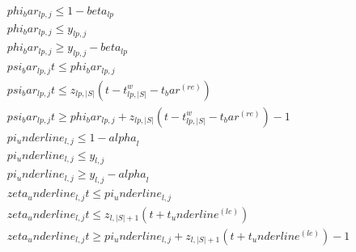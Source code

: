 \begin{align}
  & phi_bar_{lp , j} \leq 1 - \mathit{beta}_{lp} \tag{eq\_0053\_a} \\
  & phi_bar_{lp , j} \leq y_{lp , j} \tag{eq\_0053\_b} \\
  & phi_bar_{lp , j} \geq y_{lp , j} - \mathit{beta}_{lp} \tag{eq\_0053\_c} \\
  & psi_bar_{lp , j} t \leq phi_bar_{lp , j} \tag{eq\_0053\_d} \\
  & psi_bar_{lp , j} t \leq z_{lp , \left|S\right|} \left(t - t_{lp , \left|S\right|}^{w} - t_bar^{\left(r e\right)}\right) \tag{eq\_0053\_e} \\
  & psi_bar_{lp , j} t \geq phi_bar_{lp , j} + z_{lp , \left|S\right|} \left(t - t_{lp , \left|S\right|}^{w} - t_bar^{\left(r e\right)}\right) - 1 \tag{eq\_0053\_f} \\
  & pi_underline_{l , j} \leq 1 - \mathit{alpha}_{l} \tag{eq\_0053\_g} \\
  & pi_underline_{l , j} \leq y_{l , j} \tag{eq\_0053\_h} \\
  & pi_underline_{l , j} \geq y_{l , j} - \mathit{alpha}_{l} \tag{eq\_0053\_i} \\
  & zeta_underline_{l , j} t \leq pi_underline_{l , j} \tag{eq\_0053\_j} \\
  & zeta_underline_{l , j} t \leq z_{l , \left|S\right| + 1} \left(t + t_underline^{\left(l e\right)}\right) \tag{eq\_0053\_k} \\
  & zeta_underline_{l , j} t \geq pi_underline_{l , j} + z_{l , \left|S\right| + 1} \left(t + t_underline^{\left(l e\right)}\right) - 1 \tag{eq\_0053\_l} \\
\end{align}

